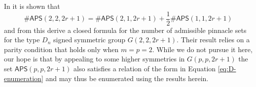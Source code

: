 \documentclass[12pt,reqno]{amsart}
\numberwithin{equation}{section}
\theoremstyle{plain}
\theoremstyle{definition}
\theoremstyle{remark}
\newcommand\APS{\mathsf{APS}}
\begin{document}
In \cite[Theorem 4.9]{PinSignedPermutations} it is shown that 
\begin{equation}\label{eq:D-enumeration}
\# \APS(2,2,2r+1) = \#\APS(2,1,2r+1)
+\frac{1}{2}\#\APS(1,1,2r+1)
\end{equation}
and from this derive a closed formula for the number of admissible pinnacle sets for the type $D_n$ signed symmetric group $G(2,2,2r+1)$. Their result relies on a parity condition that holds only when $m=p=2$. While we do not pursue it here, our hope is that by appealing to some higher symmetries in $G(p,p,2r+1)$ the set $\APS(p,p,2r+1)$ also satisfies a relation of the form in Equation \eqref{eq:D-enumeration} and may thus be enumerated using the results herein. 

{}

\end{document}
